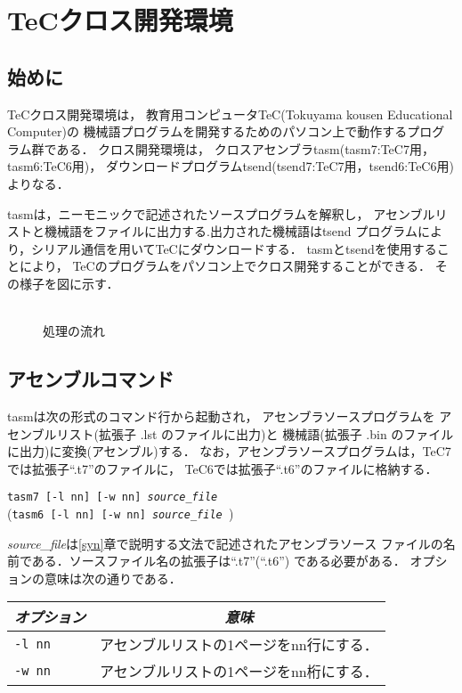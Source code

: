 \renewcommand{\myepsfbox}[1]{\epsfbox{appB/#1}}

\newpage
\onecolumn
\chapter{TeCクロス開発環境}
\label{cross}
\section{始めに}
TeCクロス開発環境は，
教育用コンピュータTeC(Tokuyama kousen Educational Computer)の
機械語プログラムを開発するためのパソコン上で動作するプログラム群である．
クロス開発環境は，
クロスアセンブラtasm(tasm7:TeC7用，tasm6:TeC6用)，
ダウンロードプログラムtsend(tsend7:TeC7用，tsend6:TeC6用)よりなる．

tasmは，ニーモニックで記述されたソースプログラムを解釈し，
アセンブルリストと機械語をファイルに出力する.出力された機械語はtsend
プログラムにより，シリアル通信を用いてTeCにダウンロードする．
tasmとtsendを使用することにより，
TeCのプログラムをパソコン上でクロス開発することができる．
その様子を図に示す．

\begin{figure}[bthp]
\begin{center}
\epsfxsize=10cm
\myepsfbox{syori.pdf} \\
処理の流れ
\end{center}
\end{figure}

\section{アセンブルコマンド}
tasmは次の形式のコマンド行から起動され，
アセンブラソースプログラムを
アセンブルリスト(拡張子 .lst のファイルに出力)と
機械語(拡張子 .bin のファイルに出力)に変換(アセンブル)する．
なお，アセンブラソースプログラムは，TeC7では拡張子``.t7''のファイルに，
TeC6では拡張子``.t6''のファイルに格納する．
\begin{center}
{\tt tasm7 [-l nn] [-w nn] {\it source\_file} } \\
({\tt tasm6 [-l nn] [-w nn] {\it source\_file} })
\end{center}
{\it source\_file}は\ref{syn}章で説明する文法で記述されたアセンブラソース
ファイルの名前である．ソースファイル名の拡張子は``.t7''(``.t6'')
である必要がある．
オプションの意味は次の通りである．
\vspace{0.2cm}
\begin{center}
\begin{tabular}{ll} \hline
\multicolumn{1}{c}{\it オプション} & \multicolumn{1}{c}{\it 意味} \\ \hline
{\tt -l nn}  &  アセンブルリストの1ページをnn行にする． \\
{\tt -w nn}  &  アセンブルリストの1ページをnn桁にする． \\ \hline
\end{tabular}
\end{center}
\vspace{0.2cm}

